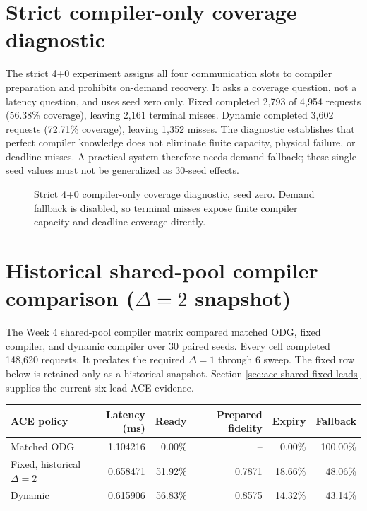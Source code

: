 \documentclass[11pt,a4paper]{report}
\begin{document}
\section{Strict compiler-only coverage diagnostic}
The strict 4+0 experiment assigns all four communication slots to compiler
preparation and prohibits on-demand recovery. It asks a coverage question, not
a latency question, and uses seed zero only. Fixed completed 2,793 of 4,954
requests (56.38\% coverage), leaving 2,161 terminal misses. Dynamic completed
3,602 requests (72.71\% coverage), leaving 1,352 misses. The diagnostic
establishes that perfect compiler knowledge does not eliminate finite capacity,
physical failure, or deadline misses. A practical system therefore needs demand
fallback; these single-seed values must not be generalized as 30-seed effects.

\begin{figure}[htbp]
\centering
{}
\caption{Strict 4+0 compiler-only coverage diagnostic, seed zero. Demand
fallback is disabled, so terminal misses expose finite compiler capacity and
deadline coverage directly.}
\label{fig:strict-coverage}
\end{figure}

\section{Historical shared-pool compiler comparison ($\Delta=2$ snapshot)}
The Week 4 shared-pool compiler matrix compared matched ODG, fixed compiler,
and dynamic compiler over 30 paired seeds. Every cell completed 148,620
requests. It predates the required $\Delta=1$ through $6$ sweep. The fixed
row below is retained only as a historical snapshot. Section
\ref{sec:ace-shared-fixed-leads} supplies the current six-lead ACE evidence.

\begin{center}
\begin{tabular}{lrrrrr}
\toprule
ACE policy & Latency (ms) & Ready & Prepared fidelity & Expiry & Fallback \\
\midrule
Matched ODG & 1.104216 & 0.00\% & -- & 0.00\% & 100.00\% \\
Fixed, historical $\Delta=2$ & 0.658471 & 51.92\% & 0.7871 & 18.66\% & 48.06\% \\
Dynamic & 0.615906 & 56.83\% & 0.8575 & 14.32\% & 43.14\% \\
\bottomrule
\end{tabular}
\end{center}
\end{document}
